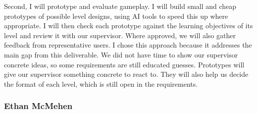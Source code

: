 \documentclass[10pt]{article}
\begin{document}
\begin{enumerate}
    Second, I will prototype and evaluate gameplay. I will build small
    and cheap prototypes of possible level designs, using AI tools to
    speed this up where appropriate. I will then check each prototype
    against the learning objectives of its level and review it with
    our supervisor. Where approved, we will also gather feedback from
    representative users. I chose this approach because it addresses
    the main gap from this deliverable. We did not have time to show
    our supervisor concrete ideas, so some requirements are still
    educated guesses. Prototypes will give our supervisor something
    concrete to react to. They will also help us decide the format of
    each level, which is still open in the requirements.

\end{enumerate}

\subsubsection*{Ethan McMehen}
\end{document}
